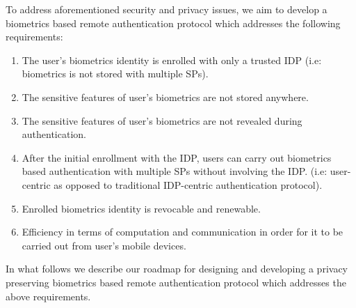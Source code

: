 \documentclass[10pt]{article}
\begin{document}
To address aforementioned security and privacy issues, we aim to develop a biometrics based remote authentication protocol which addresses the 
following requirements:
\begin{enumerate}
 \item The user's biometrics identity is enrolled with only a trusted IDP (i.e: biometrics is not stored with multiple SPs).
 \item The sensitive features of user's biometrics are not stored anywhere.
 \item The sensitive features of user's biometrics are not revealed during authentication.
 \item After the initial enrollment with the IDP, users can carry out biometrics based authentication with multiple SPs without 
involving the IDP. (i.e: user-centric as opposed to traditional IDP-centric authentication protocol).
 \item Enrolled biometrics identity is revocable and renewable.
 \item Efficiency in terms of computation and communication in order for it to be carried out from user's mobile devices.
\end{enumerate}

In what follows we describe our roadmap for designing and developing a privacy preserving biometrics based remote authentication protocol which addresses the above requirements.
\end{document}
